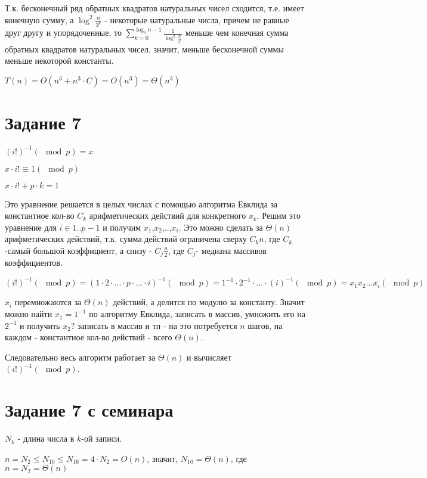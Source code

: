 \documentclass[a4paper,12pt]{article}
\begin{document}
Т.к. бесконечный ряд обратных квадратов натуральных чисел сходится, т.е. имеет конечную сумму, а $\log^2{\frac{n}{3^k}}$ - некоторые натуральные числа, причем не равные друг другу и упорядоченные, то $\sum\limits_{k=0}^{\log_{3}{n}-1}\frac{1}{\log^2{\frac{n}{3^k}}}$ меньше чем конечная сумма обратных квадратов натуральных чисел, значит, меньше бесконечной суммы
меньше некоторой константы.

$T(n)=O(n^3+n^3\cdot C)=O(n^3)=\Theta(n^3)$

\section*{Задание 7}  
\hspace{0.5cm}
$(i!)^{-1}(\mod p)=x$

$x\cdot i!\equiv 1(\mod p)$

$x\cdot i!+p\cdot k=1$

Это уравнение решается в целых числах с помощью алгоритма Евклида за константное кол-во $C_{k}$ арифметических действий  для конкретного $x_{k}$. Решим это уравнение для $i\in{1..p-1}$ и получим $x_{1}$,$x_{2}$,..,$x_{i}$. Это можно сделать за $\Theta(n)$ арифметических действий, т.к. сумма действий ограничена сверху $C_{k}n$, где  $C_{k}$-самый большой коэффициент, а снизу - $C_{j}\frac{n}{2}$, где $C_{j}$- медиана массивов коэффициентов.

$(i!)^{-1}(\mod p)=(1\cdot2\cdot...\cdot p\cdot...\cdot i)^{-1}(\mod p)=1^{-1}\cdot2^{-1}\cdot...\cdot (i)^{-1}(\mod p)= x_{1}x_{2}...x_{i}(\mod p)$

$x_{i}$ перемножаются за $\Theta(n)$ действий, а делится по модулю за константу. Значит можно найти $x_{1}=1^{-1}$ по алгоритму Евклида, записать в массив, умножить его на $2^{-1}$ и получить $x_{2}$? записать в массив и тп - на это потребуется $n$ шагов, на каждом - константное кол-во действий - всего $\Theta(n)$.

Следовательно весь алгоритм работает за $\Theta(n)$ и вычисляет $(i!)^{-1}(\mod p)$.



\section*{Задание 7 с семинара}  
\hspace{0.5cm}

$N_{k}$ - длина числа в $k$-ой записи.

$n=N_{2}\leq N_{10}\leq N_{16}=4\cdot N_{2}=O(n)$, значит, $N_{10}=\Theta(n)$, где $n=N_{2}=\Theta(n)$
\end{document}
